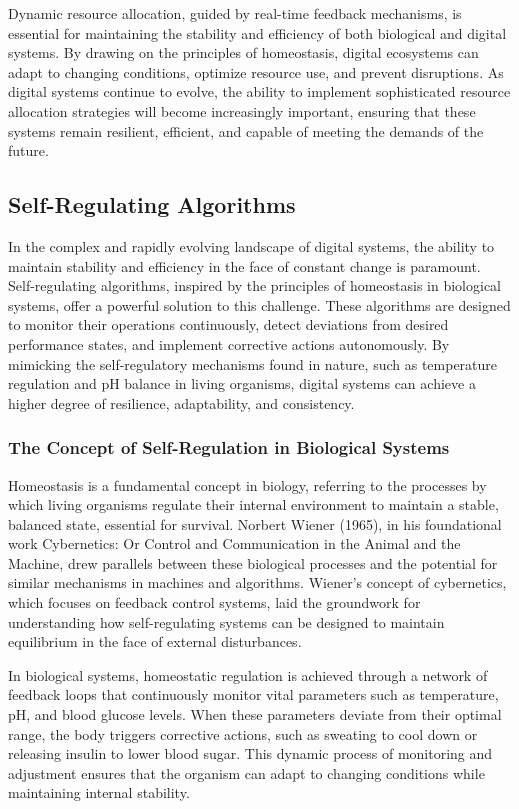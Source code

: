 \documentclass[12pt,twoside]{article}
\begin{document}
Dynamic resource allocation, guided by real-time feedback mechanisms, is essential for maintaining the stability and efficiency of both biological and digital systems. By drawing on the principles of homeostasis, digital ecosystems can adapt to changing conditions, optimize resource use, and prevent disruptions. As digital systems continue to evolve, the ability to implement sophisticated resource allocation strategies will become increasingly important, ensuring that these systems remain resilient, efficient, and capable of meeting the demands of the future.

\subsection{Self-Regulating Algorithms}

In the complex and rapidly evolving landscape of digital systems, the ability to maintain stability and efficiency in the face of constant change is paramount. Self-regulating algorithms, inspired by the principles of homeostasis in biological systems, offer a powerful solution to this challenge. These algorithms are designed to monitor their operations continuously, detect deviations from desired performance states, and implement corrective actions autonomously. By mimicking the self-regulatory mechanisms found in nature, such as temperature regulation and pH balance in living organisms, digital systems can achieve a higher degree of resilience, adaptability, and consistency.

\subsubsection{The Concept of Self-Regulation in Biological Systems}

Homeostasis is a fundamental concept in biology, referring to the processes by which living organisms regulate their internal environment to maintain a stable, balanced state, essential for survival. Norbert Wiener (1965), in his foundational work Cybernetics: Or Control and Communication in the Animal and the Machine, drew parallels between these biological processes and the potential for similar mechanisms in machines and algorithms. Wiener’s concept of cybernetics, which focuses on feedback control systems, laid the groundwork for understanding how self-regulating systems can be designed to maintain equilibrium in the face of external disturbances.

In biological systems, homeostatic regulation is achieved through a network of feedback loops that continuously monitor vital parameters such as temperature, pH, and blood glucose levels. When these parameters deviate from their optimal range, the body triggers corrective actions, such as sweating to cool down or releasing insulin to lower blood sugar. This dynamic process of monitoring and adjustment ensures that the organism can adapt to changing conditions while maintaining internal stability.
\end{document}
